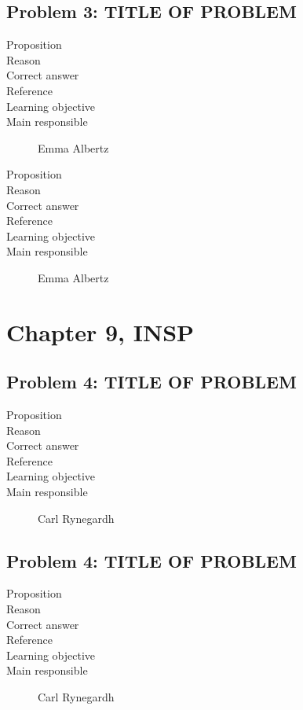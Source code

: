 \documentclass[10pt,a4paper]{article}
\begin{document}
\subsection*{Problem 3: TITLE OF PROBLEM}
\begin{description}
\item[Proposition] 
\item[Reason] 
\item[Correct answer]
\item[Reference]
\item[Learning objective]
\item[Main responsible] Emma Albertz
\end{description}

\begin{description}
\item[Proposition] 
\item[Reason] 
\item[Correct answer]
\item[Reference]
\item[Learning objective]
\item[Main responsible] Emma Albertz
\end{description}

\section*{Chapter 9, INSP}
\subsection*{Problem 4: TITLE OF PROBLEM}
\begin{description}
\item[Proposition] 
\item[Reason] 
\item[Correct answer]
\item[Reference]
\item[Learning objective]
\item[Main responsible] Carl Rynegardh
\end{description}

\subsection*{Problem 4: TITLE OF PROBLEM}
\begin{description}
\item[Proposition] 
\item[Reason] 
\item[Correct answer]
\item[Reference]
\item[Learning objective]
\item[Main responsible] Carl Rynegardh
\end{description}
\end{document}
